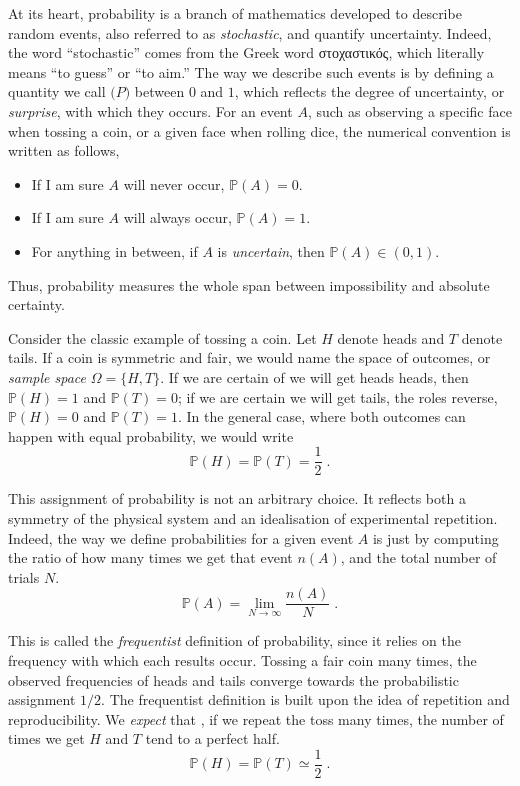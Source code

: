 \documentclass{book}
\begin{document}
At its heart, probability is a branch of mathematics developed to describe random events, also referred to as \textit{stochastic}, and quantify uncertainty. Indeed, the word “stochastic” comes from the Greek word \textgreek{στοχαστικός}, which literally means “to guess” or “to aim.” The way we describe such events is by defining a quantity we call $\mathbb(P)$ between $0$ and $1$, which reflects the degree of uncertainty, or \textit{surprise}, with which they occurs. For an event $A$, such as observing a specific face when tossing a coin, or a given face when rolling dice, the numerical convention is written as follows,
\begin{itemize}
    \item If I am sure $A$ will never occur, $\mathbb{P}(A)=0$.
    \item If I am sure $A$ will always occur, $\mathbb{P}(A)=1$.
    \item For anything in between, if $A$ is \textit{uncertain}, then $\mathbb{P}(A) \in (0,1)$.
\end{itemize}
Thus, probability measures the whole span between impossibility and absolute certainty. 

\medskip

Consider the classic example of tossing a coin. Let $H$ denote heads and $T$ denote tails. If a coin is symmetric and fair, we would name the space of outcomes, or \textit{sample space} $\Omega = \{H,T\}$. If we are certain of we will get heads heads, then $\mathbb{P}(H)=1$ and $\mathbb{P}(T)=0$; if we are certain we will get tails, the roles reverse, $\mathbb{P}(H) = 0$ and $\mathbb{P}(T) = 1$. In the general case, where both outcomes can happen with equal probability, we would write
\begin{equation}
	\mathbb{P}(H) = \mathbb{P}(T) = \frac{1}{2} \; .
	\label{eq:prob_coin}
\end{equation}

This assignment of probability is not an arbitrary choice. It reflects both a symmetry of the physical system and an idealisation of experimental repetition. Indeed, the way we define probabilities for a given event $A$ is just by computing the ratio of how many times we get that event $n(A)$, and the total number of trials $N$.
\begin{equation}
    \mathbb{P}(A) = \lim_{N\to\infty} \frac{n(A)}{N} \; .
    \label{eq:prob_frequentist}
\end{equation}

This is called the \textit{frequentist} definition of probability, since it relies on the frequency with which each results occur. Tossing a fair coin many times, the observed frequencies of heads and tails converge towards the probabilistic assignment $1/2$. The frequentist definition is built upon the idea of repetition and reproducibility. We \textit{expect} that , if we repeat the toss many times, the number of times we get $H$ and $T$ tend to a perfect half.
\begin{equation}
	\mathbb{P}(H) = \mathbb{P}(T) \simeq \frac{1}{2} \; .
	\label{eq:prob_coin}
\end{equation}
\end{document}
